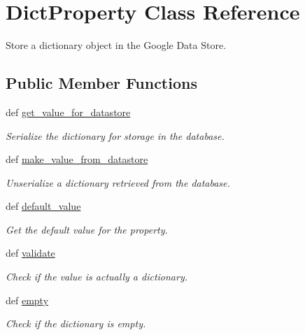 \hypertarget{classbackend_1_1_dict_property}{
\section{DictProperty Class Reference}
\label{classbackend_1_1_dict_property}
}


Store a dictionary object in the Google Data Store.  
\subsection*{Public Member Functions}
\begin{DoxyCompactItemize}
\item 
def \hyperlink{classbackend_1_1_dict_property_a54cc138e6df3ad55c38fa5db72327963}{get\_\-value\_\-for\_\-datastore}
\begin{DoxyCompactList}\small\item\em Serialize the dictionary for storage in the database. \item\end{DoxyCompactList}\item 
def \hyperlink{classbackend_1_1_dict_property_a464c5a5f52df989128b5fc067ea34512}{make\_\-value\_\-from\_\-datastore}
\begin{DoxyCompactList}\small\item\em Unserialize a dictionary retrieved from the database. \item\end{DoxyCompactList}\item 
def \hyperlink{classbackend_1_1_dict_property_a64bfffc058d933b3b0599f5bc7c049d1}{default\_\-value}
\begin{DoxyCompactList}\small\item\em Get the default value for the property. \item\end{DoxyCompactList}\item 
def \hyperlink{classbackend_1_1_dict_property_a8f3dc5c8aaf85c281c2f52cda259aa56}{validate}
\begin{DoxyCompactList}\small\item\em Check if the value is actually a dictionary. \item\end{DoxyCompactList}\item 
def \hyperlink{classbackend_1_1_dict_property_aad7084fad37d1cf9b41a738ecfbbd249}{empty}
\begin{DoxyCompactList}\small\item\em Check if the dictionary is empty. \item\end{DoxyCompactList}\end{DoxyCompactItemize}

